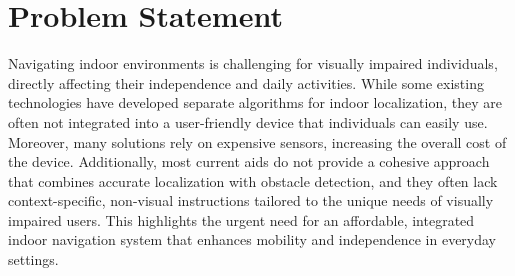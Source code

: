 \section{Problem Statement}
Navigating indoor environments is challenging for visually impaired individuals, directly affecting their independence and daily activities. While some existing technologies have developed separate algorithms for indoor localization, they are often not integrated into a user-friendly device that individuals can easily use. Moreover, many solutions rely on expensive sensors, increasing the overall cost of the device. Additionally, most current aids do not provide a cohesive approach that combines accurate localization with obstacle detection, and they often lack context-specific, non-visual instructions tailored to the unique needs of visually impaired users. This highlights the urgent need for an affordable, integrated indoor navigation system that enhances mobility and independence in everyday settings.
